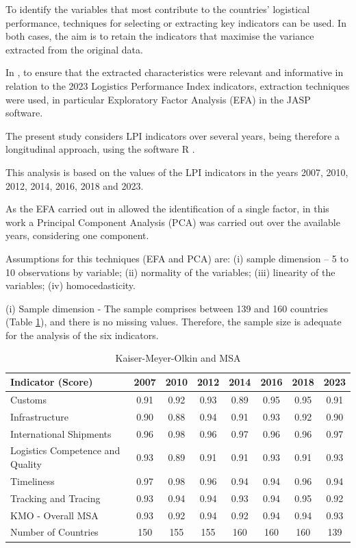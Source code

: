 \documentclass[sigconf]{acmart}
\begin{document}
To identify the variables that most contribute  to the countries' logistical performance, techniques for selecting or extracting key indicators can be used. In both cases, the aim is to retain the indicators that maximise the variance extracted from the original data.

In \cite{correiaICIE}, to ensure that the extracted characteristics were relevant and informative in relation to the 2023 Logistics Performance Index indicators, extraction techniques were used, in particular Exploratory Factor Analysis (EFA) in the JASP \cite{JASP} software.

The present study considers LPI indicators over several years, being therefore a longitudinal approach, using the software R \cite{R}.

This analysis is based on the values of the LPI \cite{lpi_worldbank_2023} indicators in the years 2007, 2010, 2012, 2014, 2016, 2018 and 2023.

As the EFA carried out in \cite{correiaICIE} allowed the identification of a single factor, in this work a Principal Component Analysis (PCA) was carried out over the available years, considering one component.

Assumptions for this techniques (EFA and PCA)  are: (i) sample dimension -- 5 to 10 observations by variable; (ii) normality of the variables; (iii) linearity of the variables; (iv) homocedasticity.

(i) Sample dimension - The sample comprises between 139 and 160 countries (Table \ref{tab:kmo}), and there is no missing values. Therefore, the sample size is adequate for the analysis of the six indicators.

\begin{table}[h]
  \caption{Kaiser-Meyer-Olkin and MSA}
  \label{tab:kmo}
\begin{tabular}{lccccccc}
\toprule
\textbf{Indicator (Score)}	&	\textbf{2007}	&	\textbf{2010}	&	\textbf{2012}	&	\textbf{2014}	&	\textbf{2016}	&	\textbf{2018}	&	\textbf{2023}	\\  
\midrule
Customs	&	0.91	&	0.92	&	0.93	&	0.89	&	0.95	&	0.95	&	0.91	\\	
Infrastructure	&	0.90	&	0.88	&	0.94	&	0.91	&	0.93	&	0.92	&	0.90	\\	 
International Shipments	&	0.96	&	0.98	&	0.96	&	0.97	&	0.96	&	0.96	&	0.97	\\	 
Logistics Competence and Quality	&	0.93	&	0.89	&	0.91	&	0.91	&	0.93	&	0.91	&	0.93	\\	 
Timeliness	&	0.97	&	0.98	&	0.96	&	0.94	&	0.94	&	0.96	&	0.94	\\	 
Tracking and Tracing	&	0.93	&	0.94	&	0.94	&	0.93	&	0.94	&	0.95	&	0.92	\\	 
\midrule
KMO - Overall MSA	&	0.93	&	0.92	&	0.94	&	0.92	&	0.94	&	0.94	&	0.93	\\	 
\midrule
Number of Countries	&	150	&	155	&	155	&	160	&	160	&	160	&	139\\	
\bottomrule
\end{tabular}
\end{table}
\end{document}
